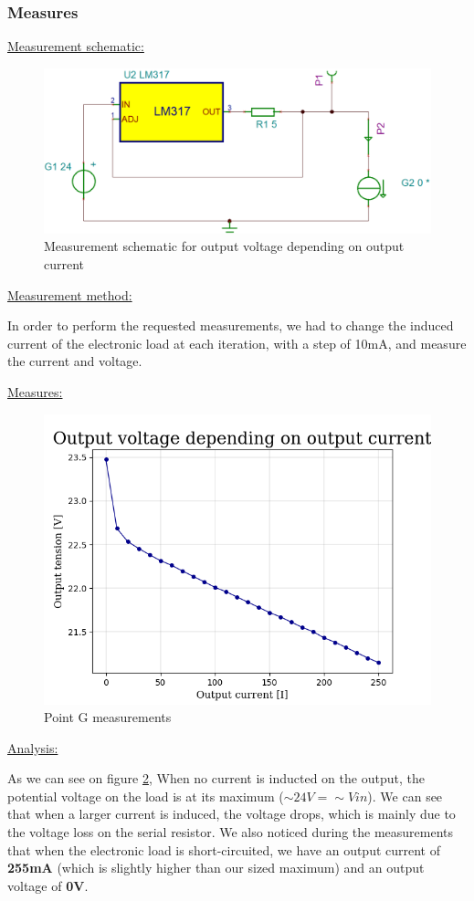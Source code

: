 {\clearpage

\subsubsection{Measures}
\underline{Measurement schematic:}
\begin{figure}[h]
	\centering
	\includegraphics[width=0.6\linewidth]{../../SchemaMesureChargeElectronique}
	\caption{Measurement schematic for output voltage depending on output current}
	\label{fig:schemamesurechargeelectronique}
\end{figure}

\underline{Measurement method:}

In order to perform the requested measurements, we had to change the induced current of the electronic load at each iteration, with a step of 10mA, and measure the current and voltage.\vspace{+6pt}

\underline{Measures:}
\begin{figure}[h]
	\centering
	\includegraphics[width=0.7\linewidth]{../../Grph-pointG}
	\caption{Point G measurements}
	\label{fig:grph-pointg}
\end{figure}

\clearpage
\underline{Analysis:}

As we can see on figure \ref{fig:grph-pointg}, When no current is inducted on the output, the potential voltage on the load is at its maximum (\textbf{$\sim 24V = \sim Vin$}). We can see that when a larger current is induced, the voltage drops, which is mainly due to the voltage loss on the serial resistor. We also noticed during the measurements that when the electronic load is short-circuited, we have an output current of \textbf{255mA} (which is slightly higher than our sized maximum) and an output voltage of \textbf{0V}.

}
